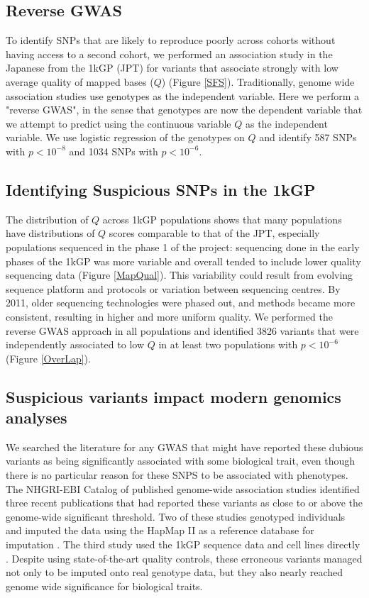 \documentclass[
11pt, %
oneside, %
english, %
doublespacing, %
headsepline, %
chapterinoneline, %
]{MastersDoctoralThesis} %
\begin{document}
\subsection{Reverse GWAS}
To identify SNPs that are likely to reproduce poorly across cohorts without having access to a second cohort, we performed an association study in the Japanese from the 1kGP (JPT) for variants that associate strongly with low average quality of mapped bases ($Q$) (Figure \ref{SFS}).
Traditionally, genome wide association studies use genotypes as the independent variable. 
Here we perform a "reverse GWAS", in the sense that genotypes are now the dependent variable that we attempt to predict using the continuous variable $Q$ as the independent variable.
We use logistic regression of the genotypes on $Q$ and identify 587 SNPs with $p < 10^{-8}$ and 1034 SNPs with $ p < 10^{-6}$.

\subsection{Identifying Suspicious SNPs in the 1kGP}
The distribution of $Q$ across 1kGP populations shows that many populations have distributions of $Q$ scores comparable to that of the JPT, especially populations sequenced in the phase 1 of the project: sequencing done in the early phases of the 1kGP was more variable and overall tended to include lower quality sequencing data (Figure \ref{MapQual}).
This variability could result from evolving sequence platform and protocols or variation between sequencing centres. 
By 2011, older sequencing technologies were phased out, and methods became more consistent, resulting in higher and more uniform quality.
We performed the reverse GWAS approach in all populations and identified 3826 variants that were independently associated to low $Q$ in at least two populations with $ p < 10^{-6}$ (Figure \ref{OverLap}). 

\subsection{Suspicious variants impact modern genomics analyses}
We searched the literature for any GWAS that might have reported these dubious variants as being significantly associated with some biological trait, even though there is no particular reason for these SNPS to be associated with phenotypes.
The NHGRI-EBI Catalog of published genome-wide association studies identified three recent publications that had reported these variants as close to or above the genome-wide significant threshold.
Two of these studies genotyped individuals and imputed the data using the HapMap II as a reference  database for imputation \citep{Kraja2011, Ebejer2013}.
The third study used the 1kGP sequence data and cell lines directly \citep{Mandage2017}.
Despite using state-of-the-art quality controls, these erroneous variants managed not only to be imputed onto real genotype data, but they also nearly reached genome wide significance for biological traits.
\end{document}
